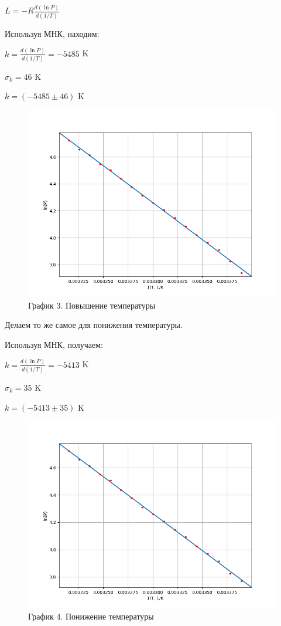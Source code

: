\documentclass[a4paper,12pt]{article} %
\begin{document}
\begin{enumerate}
	$L = -R\frac{d(\ln{P})}{d(1/T)}$
	
	Используя МНК, находим:
	
	$k = \frac{d(\ln{P})}{d(1/T)} = -5485$ K
	
	$\sigma_{k} = 46$ K
	
	$k = (-5485 \pm 46)$ K
	\newpage
	\begin{figure}[h!]
		\centering
		\includegraphics[scale = 0.8]{Pictures/График 3.png}
		\caption*{График 3. Повышение температуры}
	\end{figure}
	
	\vspace{15mm}
	
	Делаем то же самое для понижения температуры.
	
	Используя МНК, получаем:
	
	$k = \frac{d(\ln{P})}{d(1/T)} = -5413$ K
	
	$\sigma_{k} = 35$ K
	
	$k = (-5413 \pm 35)$ K
	\newpage
	\begin{figure}[h!]
		\centering
		\includegraphics[scale = 0.8]{Pictures/График 4.png}
		\caption*{График 4. Понижение температуры}
	\end{figure}


\end{enumerate}
\end{document}
